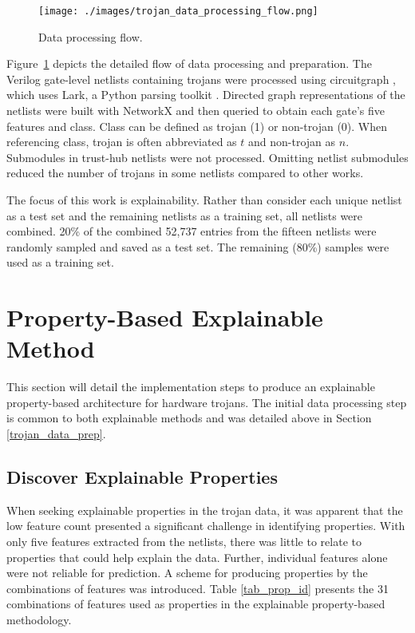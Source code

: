 \begin{figure}[h]
    \centering
    \texttt{[image: ./images/trojan\_data\_processing\_flow.png]}
    \caption{Data processing flow.}
    \label{fig:data_prep}
\end{figure}

Figure~\ref{fig:data_prep} depicts the detailed flow of data processing and
preparation. The Verilog gate-level netlists containing trojans were processed
using circuitgraph \cite{circuitgraph}, which uses Lark, a Python parsing
toolkit \cite{lark}. Directed graph representations of the netlists were built
with NetworkX \cite{networkx} and then queried to obtain each gate's five
features and class. Class can be defined as trojan (1) or non-trojan (0). When
referencing class, trojan is often abbreviated as $t$ and non-trojan as $n$.
Submodules in trust-hub netlists were not processed. Omitting netlist submodules
reduced the number of trojans in some netlists compared to other works.

The focus of this work is explainability. Rather than consider each unique
netlist as a test set and the remaining netlists as a training set, all netlists
were combined. 20\% of the combined 52,737 entries from the fifteen netlists
were randomly sampled and saved as a test set. The remaining (80\%) samples were
used as a training set\cite{whitten2024naecon}.



\section{Property-Based Explainable Method} \label{prop_explainable_arch}

This section will detail the implementation steps to produce an explainable
property-based architecture for hardware trojans.  The initial data processing
step is common to both explainable methods and was detailed above in Section
\ref{trojan_data_prep}.

\subsection{Discover Explainable Properties}

When seeking explainable properties  in the trojan data, it was apparent that
the low feature count presented a significant challenge in identifying
properties. With only five features extracted from the netlists, there was
little to relate to properties that could help explain the data. Further,
individual features alone were not reliable for prediction.  A scheme for
producing properties by the combinations of features was introduced. Table
\ref{tab_prop_id} presents the 31 combinations of features used as properties
in the explainable property-based methodology.

